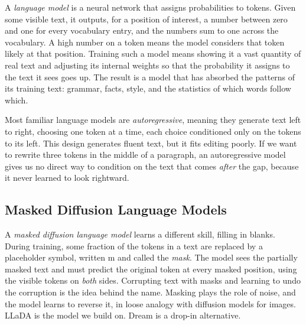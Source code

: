 \documentclass[]{paper}
\newcommand{\mask}{\ensuremath{\mathrm{m}}}
\begin{document}
A \emph{language model} is a neural network that assigns probabilities to tokens. Given some visible text, it outputs, for a position of interest, a number between zero and one for every vocabulary entry, and the numbers sum to one across the vocabulary. A high number on a token means the model considers that token likely at that position. Training such a model means showing it a vast quantity of real text and adjusting its internal weights so that the probability it assigns to the text it sees goes up. The result is a model that has absorbed the patterns of its training text: grammar, facts, style, and the statistics of which words follow which.

Most familiar language models are \emph{autoregressive}, meaning they generate text left to right, choosing one token at a time, each choice conditioned only on the tokens to its left. This design generates fluent text, but it fits editing poorly. If we want to rewrite three tokens in the middle of a paragraph, an autoregressive model gives us no direct way to condition on the text that comes \emph{after} the gap, because it never learned to look rightward.

\subsection{Masked Diffusion Language Models}
\label{sec:mdlm}

A \emph{masked diffusion language model} learns a different skill, filling in blanks. During training, some fraction of the tokens in a text are replaced by a placeholder symbol, written \mask{} and called the \emph{mask}. The model sees the partially masked text and must predict the original token at every masked position, using the visible tokens on \emph{both} sides. Corrupting text with masks and learning to undo the corruption is the idea behind the name. Masking plays the role of noise, and the model learns to reverse it, in loose analogy with diffusion models for images. LLaDA \citep{nie-etal-2025-llada} is the model we build on. Dream \citep{ye-etal-2025-dream} is a drop-in alternative.
\end{document}
